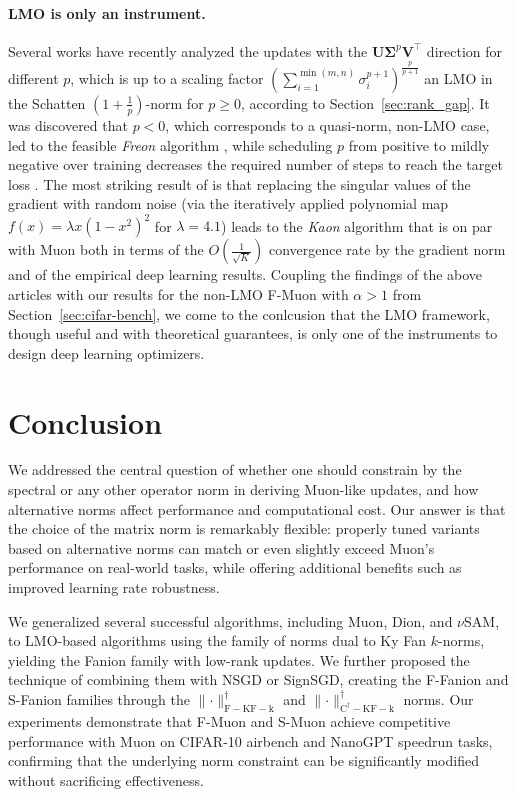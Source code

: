\documentclass[a4paper,14pt,oneside]{extarticle}
\newcommand{\norm}[1]{\lVert #1\rVert}
\newcommand{\mU}{\mathbf{U}}
\newcommand{\mV}{\mathbf{V}}
\newcommand{\mSigma}{\mathbf{\Sigma}}
\newcommand{\sectionref}[1]{Section~\ref{#1}}
\begin{document}
\paragraph{LMO is only an instrument.} Several works \citep{qi2026delving,shumaylov2026muon,wu2026dynmuon} have recently analyzed the updates with the $\mU \mSigma^p \mV^\top$ direction for different $p$, which is up to a scaling factor $\left(\sum_{i=1}^{\min(m,n)}{\sigma_i^{p+1}}\right)^{\frac{p}{p+1}}$ an LMO in the Schatten $\left(1 + \frac{1}{p}\right)$-norm for $p \geq 0$, according to \sectionref{sec:rank_gap}. It was discovered that $p < 0$, which corresponds to a quasi-norm, non-LMO case, led to the feasible \emph{Freon} algorithm \citep{shumaylov2026muon}, while scheduling $p$ from positive to mildly negative over training decreases the required number of steps to reach the target loss \citep{wu2026dynmuon}. The most striking result of \citep{shumaylov2026muon} is that replacing the singular values of the gradient with random noise (via the iteratively applied polynomial map $f(x) = \lambda x(1 - x^2)^2$ for $\lambda = 4.1$) leads to the \emph{Kaon} algorithm that is on par with Muon both in terms of the $O\left(\frac{1}{\sqrt{K}}\right)$ convergence rate by the gradient norm and of the empirical deep learning results. Coupling the findings of the above articles with our results for the non-LMO F-Muon with $\alpha > 1$ from \sectionref{sec:cifar-bench}, we come to the conlcusion that the LMO framework, though useful and with theoretical guarantees, is only one of the instruments to design deep learning optimizers.

\section*{Conclusion}

We addressed the central question of whether one should constrain by the spectral or any other operator norm in deriving Muon-like updates, and how alternative norms affect performance and computational cost. Our answer is that the choice of the matrix norm is remarkably flexible: properly tuned variants based on alternative norms can match or even slightly exceed Muon's performance on real-world tasks, while offering additional benefits such as improved learning rate robustness.

We generalized several successful algorithms, including Muon, Dion, and $\nu$SAM, to LMO-based algorithms using the family of norms dual to Ky Fan $k$-norms, yielding the Fanion family with low-rank updates. We further proposed the technique of combining them with NSGD or SignSGD, creating the F-Fanion and S-Fanion families through the $\norm{\cdot}_{\mathrm{F-KF-k}}^\dagger$ and $\norm{\cdot}_{\mathrm{C^\dagger-KF-k}}^\dagger$ norms. Our experiments demonstrate that F-Muon and S-Muon achieve competitive performance with Muon on CIFAR-10 airbench and NanoGPT speedrun tasks, confirming that the underlying norm constraint can be significantly modified without sacrificing effectiveness.
\end{document}
